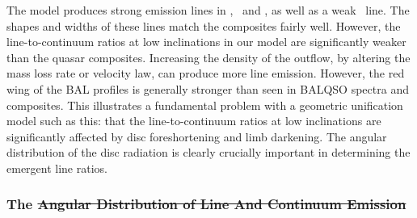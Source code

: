 \documentclass[preprint, a4paper, 11pt]{aastex}
\providecommand{\DIFadd}[1]{{\protect\color{blue}\uwave{#1}}} %
\providecommand{\DIFdel}[1]{{\protect\color{red}\sout{#1}}}                      %
\providecommand{\DIFaddbegin}{} %
\providecommand{\DIFaddend}{} %
\providecommand{\DIFdelbegin}{} %
\providecommand{\DIFdelend}{} %
\begin{document}
The model produces strong emission lines in \civ, \nv\ and \la,
as well as a weak \mg\ line. The shapes and widths of these lines
match the composites fairly well. However, the line-to-continuum ratios 
at low inclinations in our model are significantly weaker than the quasar 
composites. Increasing the density of the outflow, by altering the mass 
loss rate  or velocity law, can produce more line emission.
However, the red wing of the BAL profiles is generally stronger than 
seen in BALQSO spectra and composites. This illustrates a fundamental 
problem with a geometric unification model such as this:
that the line-to-continuum ratios at low inclinations are
significantly affected by disc foreshortening and limb darkening.
The angular distribution of the disc radiation is clearly
crucially important in determining the emergent line ratios.

\subsubsection{The \DIFdelbegin \DIFdel{Angular Distribution of Line And Continuum Emission}\DIFdelend \DIFaddbegin \DIFadd{Disc SED}\DIFaddend }
\DIFdelbegin %
\DIFdelend \DIFaddbegin \label{discsed}
\DIFaddend 
\end{document}
